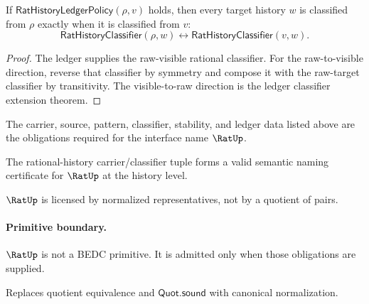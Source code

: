 \begin{theorem}
\label{thm:rat-history-ledger-classifier-endpoint-equivalence}
If $\mathsf{RatHistoryLedgerPolicy}(\rho,v)$ holds, then every target history
$w$ is classified from $\rho$ exactly when it is classified from $v$:
$$
\mathsf{RatHistoryClassifier}(\rho,w)\leftrightarrow
\mathsf{RatHistoryClassifier}(v,w).
$$
\end{theorem}
\begin{proof}
The ledger supplies the raw-visible rational classifier. For the raw-to-visible
direction, reverse that classifier by symmetry and compose it with the
raw-target classifier by transitivity. The visible-to-raw direction is the
ledger classifier extension theorem.
\end{proof}

\begin{definition}
\label{def:rat-certificate-obligations}
The carrier, source, pattern, classifier, stability, and ledger data listed above are the obligations required for the interface name \(\RatUp\).
\end{definition}

\begin{theorem}
\label{thm:concrete-rat-namecert}
The rational-history carrier/classifier tuple forms a valid semantic naming certificate for $\RatUp$ at the history level.
\end{theorem}

\begin{corollary}
\label{cor:rat-licensed-not-primitive}
\(\RatUp\) is licensed by normalized representatives, not by a quotient of pairs.
\end{corollary}

\paragraph{Primitive boundary.}
\(\RatUp\) is not a BEDC primitive. It is admitted only when those obligations are supplied.

\begin{remark}
\label{rem:rat-zero-axiom-note}
Replaces quotient equivalence and \(\mathsf{Quot.sound}\) with canonical normalization.
\end{remark}
